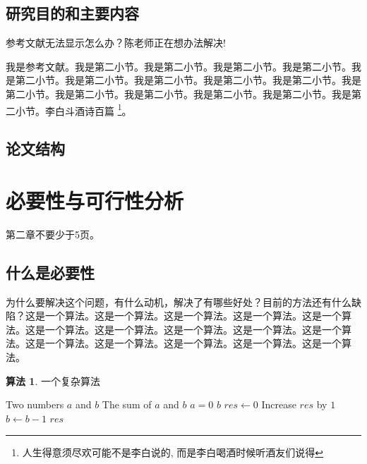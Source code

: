 \documentclass[supercite]{Experimental_Report}
\theoremstyle{definition}
\newtheorem{alg}{算法}[section]
\begin{document}
\subsection{研究目的和主要内容}

参考文献无法显示怎么办？陈老师正在想办法解决\cite{STR2021Neurocom, AVS2021Neurocom}!

我是参考文献。我是第二小节\cite{Mehrabian1974An}。我是第二小节\cite{Rezaei2014CVPR}。我是第二小节\cite{Ramnath2008IJCV}。我是第二小节。我是第二小节。我是第二小节。我是第二小节。我是第二小节。我是第二小节。我是第二小节。我是第二小节。我是第二小节。我是第二小节。我是第二小节。我是第二小节。李白斗酒诗百篇 \footnote{人生得意须尽欢可能不是李白说的, 而是李白喝酒时候听酒友们说得}。

\subsection{论文结构}

\newpage

\section{必要性与可行性分析}

第二章不要少于5页。

\subsection{什么是必要性}

为什么要解决这个问题，有什么动机，解决了有哪些好处\cite{LTE2015MIP}？目前的方法还有什么缺陷？这是一个算法。这是一个算法。这是一个算法。这是一个算法。这是一个算法。这是一个算法。这是一个算法。这是一个算法。这是一个算法。这是一个算法。这是一个算法。这是一个算法。这是一个算法。这是一个算法。这是一个算法。

\begin{shaded*}\begin{alg}{一个复杂算法}
  \label{alg:apb}
  \begin{algorithmic}
    \Input Two numbers $a$ and $b$
    \Output The sum of $a$ and $b$
      \If $a = 0$
        \State \Return $b$
      \EndIf
      \State $res \gets 0$
        \State Increase $res$ by $1$
        \State $b \gets b - 1$
      \EndWhile
      \State \Return $res$
    \EndProcedure
  \end{algorithmic}
\end{alg}\end{shaded*}
\end{document}
